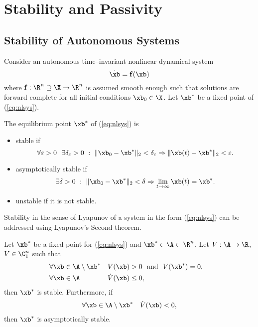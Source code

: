 \section{Stability and Passivity}

\subsection{Stability of Autonomous Systems}
%
Consider an autonomous time--invariant nonlinear dynamical system
%
\begin{equation}\label{eq:nlsys}
    \dot{\xb} = \mathbf{f}(\xb)
\end{equation}
%
where $\mathbf{f}:\R^n\supseteq\X\rightarrow\R^n$ is assumed smooth enough such that solutions are forward complete for all initial conditions $\xb_0\in\X$. Let $\xb^*$ be a fixed point of (\ref{eq:nlsys}).
%
\begin{defn}
    The equilibrium point $\xb^*$ of (\ref{eq:nlsys}) is 
    \begin{itemize}
        \item stable if
            \begin{equation}
                \forall \varepsilon>0 ~~  \exists \delta_\varepsilon>0~:~\|\xb_0 - \xb^*\|_2 <\delta_\varepsilon \Rightarrow \|\xb(t) - \xb^*\|_2<\varepsilon.
            \end{equation}
            \item asymptotically stable if
            \begin{equation}
                \exists \delta>0~:~\|\xb_0 - \xb^*\|_2<\delta\Rightarrow\lim_{t\rightarrow\infty}\xb(t) =  \xb^*.
            \end{equation}
        \item unstable if it is not stable.
    \end{itemize}
\end{defn}
%
Stability in the sense of Lyapunov of a system in the form (\ref{eq:nlsys}) can be addressed using Lyapunov's Second theorem.
%
\begin{thm}\label{thm:lyap_nl}
    Let $\xb^*$ be a fixed point for (\ref{eq:nlsys}) and $\xb^*\in\A\subset\R^n$. Let $V:\A\rightarrow\R$, $V\in\C_1^n$ such that
    \begin{align}
        & \forall \xb\in\A\setminus\xb^* && V(\xb)>0~~\text{and}~~V(\xb^*) = 0,&\\
        & \forall \xb\in\A & &\dot{V}(\xb)\leq 0,&
    \end{align}
    then $\xb^*$ is stable. Furthermore, if
    \begin{align}
        \forall \xb\in\A \setminus\xb^* ~~~ \dot{V}(\xb)< 0,
    \end{align}
    then $\xb^*$ is asymptotically stable.
\end{thm}
%
\clearpage

